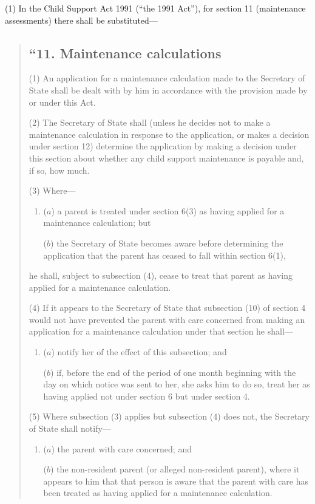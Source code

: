 \documentclass[12pt,a4paper]{article}
\begin{document}
(1) In the Child Support Act 1991 (“the 1991 Act”), for section 11 (maintenance assessments) there shall be substituted—
\begin{quotation}
\subsection*{“11. Maintenance calculations}

(1) An application for a maintenance calculation made to the Secretary of State shall be dealt with by him in accordance with the provision made by or under this Act.

(2) The Secretary of State shall (unless he decides not to make a maintenance calculation in response to the application, or makes a decision under section 12) determine the application by making a decision under this section about whether any child support maintenance is payable and, if so, how much.

(3) Where—
\begin{enumerate}\item[]
($a$) a parent is treated under section 6(3)  as having applied for a maintenance calculation; but

($b$) the Secretary of State becomes aware before determining the application that the parent has ceased to fall within section 6(1),
\end{enumerate}
he shall, subject to subsection (4), cease to treat that parent as having applied for a maintenance calculation.

(4) If it appears to the Secretary of State that subsection (10)  of section 4 would not have prevented the parent with care concerned from making an application for a maintenance calculation under that section he shall—
\begin{enumerate}\item[]
($a$) notify her of the effect of this subsection; and

($b$) if, before the end of the period of one month beginning with the day on which notice was sent to her, she asks him to do so, treat her as having applied not under section 6 but under section 4. 
\end{enumerate}

(5) Where subsection (3)  applies but subsection (4)  does not, the Secretary of State shall notify—
\begin{enumerate}\item[]
($a$) the parent with care concerned; and

($b$) the non-resident parent (or alleged non-resident parent), where it appears to him that that person is aware that the parent with care has been treated as having applied for a maintenance calculation.
\end{enumerate}


\end{quotation}
\end{document}
